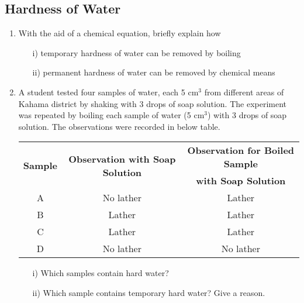 \subsection{Hardness of Water}

\begin{enumerate}
	\item With the aid of a chemical equation, briefly explain how
	\begin{enumerate}[topsep=0ex,itemsep=0ex,partopsep=1ex,parsep=1ex]
		\item[i)] temporary hardness of water can be removed by boiling
		\item[ii)] permanent hardness of water can be removed by chemical means
	\end{enumerate}
	
	\item A student tested four samples of water, each 5 cm$^3$ from different areas of Kahama district by shaking with 3 drops of soap solution. The experiment was repeated by boiling each sample of water (5 cm$^3$) with 3 drops of soap solution. The observations were recorded in below table.
	\begin{center}
		\begin{tabular}{|c|c|c|} \hline
			\multirow{2}{*}{\textbf{Sample}} & \multirow{2}{*}{\textbf{Observation with Soap Solution}} & \textbf{Observation for Boiled Sample} \\ 
			& & \textbf{with Soap Solution} \\ \hline
			A & No lather & Lather \\ \hline
			B & Lather & Lather \\ \hline
			C & Lather & Lather \\ \hline
			D & No lather & No lather \\ \hline
		\end{tabular}
	\end{center}
	\begin{enumerate}[topsep=0ex,itemsep=0ex,partopsep=1ex,parsep=1ex]
		\item[i)] Which samples contain hard water?
		\item[ii)] Which sample contains temporary hard water? Give a reason. 
	\end{enumerate}
	
\end{enumerate}








